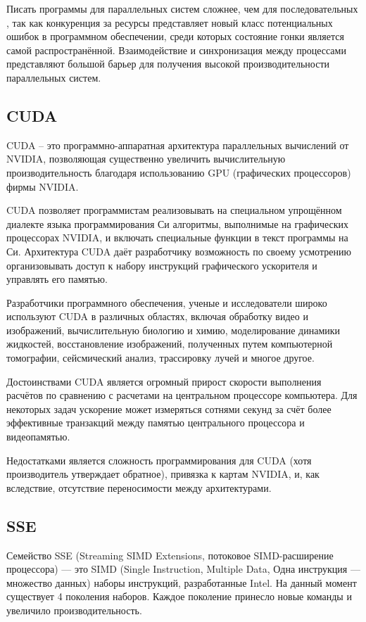 Писать программы для параллельных систем сложнее, чем для последовательных \cite{bib4}, так как конкуренция за ресурсы представляет новый класс потенциальных ошибок в программном обеспечении, среди которых состояние гонки является самой распространённой. Взаимодействие и синхронизация между процессами представляют большой барьер для получения высокой производительности параллельных систем.

\subsection{CUDA}
CUDA – это программно-аппаратная архитектура параллельных вычислений от NVIDIA, позволяющая существенно увеличить вычислительную производительность благодаря использованию GPU (графических процессоров) фирмы NVIDIA.

CUDA  позволяет программистам реализовывать на специальном упрощённом диалекте языка программирования Си алгоритмы, выполнимые на графических процессорах NVIDIA, и включать специальные функции в текст программы на Си. \cite{bib5} Архитектура CUDA даёт разработчику возможность по своему усмотрению организовывать доступ к набору инструкций графического ускорителя и управлять его памятью.

Разработчики программного обеспечения, ученые и исследователи широко используют CUDA в различных областях, включая обработку видео и изображений, вычислительную биологию и химию, моделирование динамики жидкостей, восстановление изображений, полученных путем компьютерной томографии, сейсмический анализ, трассировку лучей и многое другое.

Достоинствами CUDA является огромный прирост скорости выполнения расчётов по сравнению с расчетами на центральном процессоре компьютера. Для некоторых задач ускорение может измеряться сотнями секунд за счёт более эффективные транзакций между памятью центрального процессора и видеопамятью.

Недостатками является сложность программирования для CUDA (хотя производитель утверждает обратное), привязка к картам NVIDIA, и, как вследствие, отсутствие переносимости между архитектурами.


\subsection{SSE}
Семейство SSE (Streaming SIMD Extensions, потоковое SIMD-расширение процессора) — это SIMD (Single Instruction, Multiple Data, Одна инструкция — множество данных) наборы инструкций, разработанные Intel. На данный момент существует 4 поколения наборов. Каждое поколение принесло новые команды и увеличило производительность.\cite{bib2} 

